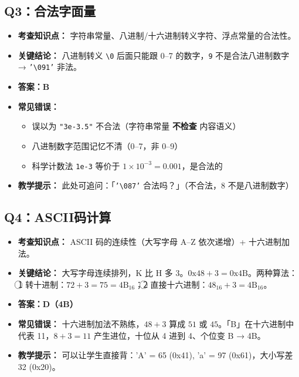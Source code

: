 \subsection{Q3：合法字面量}

\begin{itemize}
    \item \textbf{考查知识点：} 字符串常量、八进制/十六进制转义字符、浮点常量的合法性。
    \item \textbf{关键结论：} 八进制转义 \texttt{\textbackslash 0} 后面只能跟 0--7 的数字，\texttt{9} 不是合法八进制数字 → \texttt{'\textbackslash 091'} 非法。
    \item {\color{highlight}\textbf{答案：B}}
    \item \textbf{常见错误：}
    \begin{itemize}
        \item 误以为 \texttt{"3e-3.5"} 不合法（字符串常量 \textbf{不检查} 内容语义）
        \item 八进制数字范围记忆不清（0--7，非 0--9）
        \item 科学计数法 \texttt{1e-3} 等价于 $1 \times 10^{-3} = 0.001$，是合法的
    \end{itemize}
    \item \textbf{教学提示：} 此处可追问：「\texttt{'\textbackslash 087'} 合法吗？」（不合法，8 不是八进制数字）
\end{itemize}

\subsection{Q4：ASCII码计算}

\begin{itemize}
    \item \textbf{考查知识点：} ASCII 码的连续性（大写字母 A--Z 依次递增）+ 十六进制加法。
    \item \textbf{关键结论：} 大写字母连续排列，K 比 H 多 3。$\text{0x}48 + 3 = \text{0x}4\text{B}$。两种算法：\textcircled{1} 转十进制：$72 + 3 = 75 = 4\text{B}_{16}$；\textcircled{2} 直接十六进制：$48_{16} + 3 = 4\text{B}_{16}$。
    \item {\color{highlight}\textbf{答案：D（4B）}}
    \item \textbf{常见错误：} 十六进制加法不熟练，$48 + 3$ 算成 $51$ 或 $45$。「B」在十六进制中代表 11，$8+3=11$ 产生进位，十位从 4 进到 4、个位变 B → 4B。
    \item \textbf{教学提示：} 可以让学生直接背：'A' = 65 (0x41), 'a' = 97 (0x61)，大小写差 32 (0x20)。
\end{itemize}

